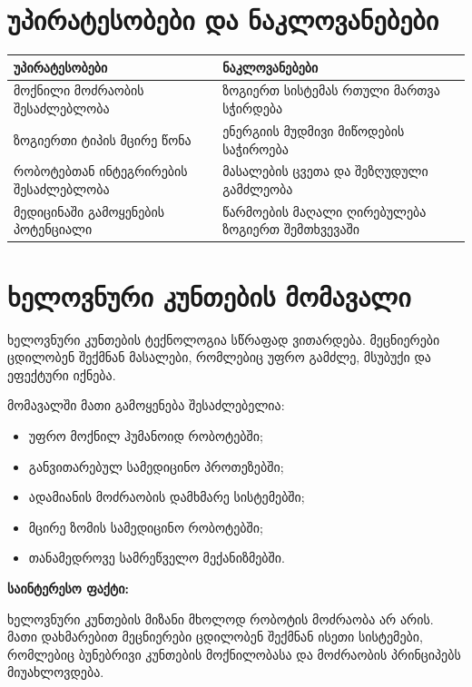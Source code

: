 \documentclass[12pt,a4paper]{article}
\begin{document}
\section{უპირატესობები და ნაკლოვანებები}

\begin{center}
\renewcommand{\arraystretch}{1.7}
\begin{tabular}{|p{6cm}|p{6cm}|}
\hline
\rowcolor{lightgreen}
\textbf{უპირატესობები} &
\textbf{ნაკლოვანებები} \\
\hline
მოქნილი მოძრაობის შესაძლებლობა &
ზოგიერთ სისტემას რთული მართვა სჭირდება \\
\hline
ზოგიერთი ტიპის მცირე წონა &
ენერგიის მუდმივი მიწოდების საჭიროება \\
\hline
რობოტებთან ინტეგრირების შესაძლებლობა &
მასალების ცვეთა და შეზღუდული გამძლეობა \\
\hline
მედიცინაში გამოყენების პოტენციალი &
წარმოების მაღალი ღირებულება ზოგიერთ შემთხვევაში \\
\hline
\end{tabular}
\end{center}


\section{ხელოვნური კუნთების მომავალი}

ხელოვნური კუნთების ტექნოლოგია სწრაფად ვითარდება. მეცნიერები ცდილობენ შექმნან მასალები, რომლებიც უფრო გამძლე, მსუბუქი და ეფექტური იქნება.

მომავალში მათი გამოყენება შესაძლებელია:

\begin{itemize}
    \item უფრო მოქნილ ჰუმანოიდ რობოტებში;
    \item განვითარებულ სამედიცინო პროთეზებში;
    \item ადამიანის მოძრაობის დამხმარე სისტემებში;
    \item მცირე ზომის სამედიცინო რობოტებში;
    \item თანამედროვე სამრეწველო მექანიზმებში.
\end{itemize}

\begin{infobox}
\textbf{საინტერესო ფაქტი:}

ხელოვნური კუნთების მიზანი მხოლოდ რობოტის მოძრაობა არ არის. მათი დახმარებით მეცნიერები ცდილობენ შექმნან ისეთი სისტემები, რომლებიც ბუნებრივი კუნთების მოქნილობასა და მოძრაობის პრინციპებს მიუახლოვდება.
\end{infobox}
\end{document}

